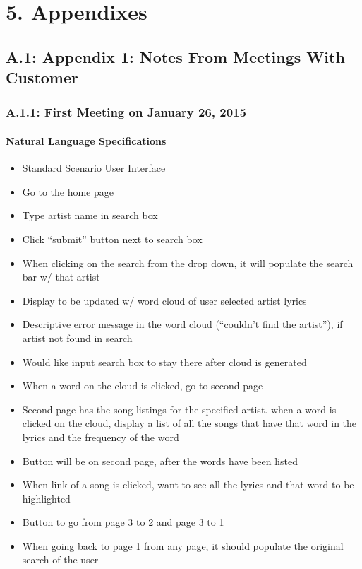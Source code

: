 \documentclass[]{article}
\begin{document}
\section{5. Appendixes}\label{appendixes}

\subsection{A.1: Appendix 1: Notes From Meetings With
Customer}\label{a.1-appendix-1-notes-from-meetings-with-customer}

\subsubsection{A.1.1: First Meeting on January 26,
2015}\label{a.1.1-first-meeting-on-january-26-2015}

\paragraph{Natural Language
Specifications}\label{natural-language-specifications}

\begin{itemize}
\itemsep1pt\parskip0pt
\item
  Standard Scenario User Interface
\item
  Go to the home page
\item
  Type artist name in search box
\item
  Click ``submit'' button next to search box
\item
  When clicking on the search from the drop down, it will populate the
  search bar w/ that artist
\item
  Display to be updated w/ word cloud of user selected artist lyrics
\item
  Descriptive error message in the word cloud (``couldn't find the
  artist''), if artist not found in search
\item
  Would like input search box to stay there after cloud is generated
\item
  When a word on the cloud is clicked, go to second page
\item
  Second page has the song listings for the specified artist. when a
  word is clicked on the cloud, display a list of all the songs that
  have that word in the lyrics and the frequency of the word
\item
  Button will be on second page, after the words have been listed
\item
  When link of a song is clicked, want to see all the lyrics and that
  word to be highlighted
\item
  Button to go from page 3 to 2 and page 3 to 1
\item
  When going back to page 1 from any page, it should populate the
  original search of the user
\end{itemize}
\end{document}
